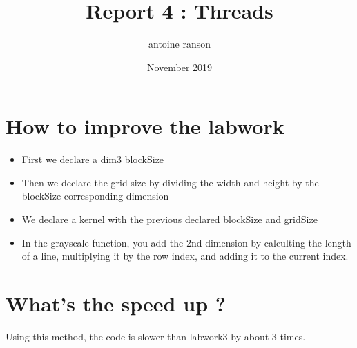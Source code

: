 \documentclass{article}
\title{Report 4 : Threads}
\author{antoine ranson }
\date{November 2019}
\begin{document}
 
\maketitle 
\section{How to improve the labwork} 
\begin{itemize} 
\item First we declare a dim3 blockSize 
\item Then we declare the grid size by dividing the width and height by the blockSize corresponding dimension 
\item We declare a kernel with the previous declared blockSize and gridSize 
\item In the grayscale function, you add the 2nd dimension by calculting the length of a line, multiplying it by 
the row index, and adding it to the current index. 
\end{itemize} 

\section{What's the speed up ?}

Using this method, the code is slower than labwork3 by about 3 times.
\end{document}
